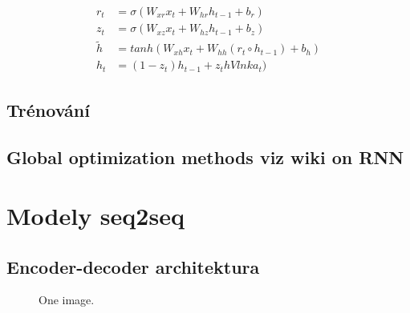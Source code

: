 \begin{align}    
    r_{t}&=\sigma(W_{xr}x_{t}+W_{hr}h_{t-1}+b_{r}) \label{figure:resetGate} \\
    z_{t}&=\sigma(W_{xz}x_{t}+W_{hz}h_{t-1}+b_{z}) \label{figure:updateGate} \\
    \tilde{h}&=tanh(W_{xh}x_t + W_{hh}(r_t \circ h_{t-1}) + b_h) \label{figure:candidate} \\
    h_{t}&=(1 - z_t)h_{t-1} + z_thVlnka_t) \label{figure:hiddenStateGru}
\end{align}


\subsection{Trénování}

\subsection{Global optimization methods viz wiki on RNN}




\section{Modely seq2seq}


\subsection{Encoder-decoder architektura}
\begin{figure}
    \begin{center}
    \end{center}
	\caption{One image. }
	\label{img:TODO}
\end{figure}




